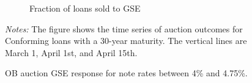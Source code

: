 \documentclass[11pt,a4paper]{article}
\begin{document}
\begin{figure}[h]
\begin{subfigure}[b]{0.49\textwidth}
      \caption{ Fraction of loans sold to GSE}
     \end{subfigure}
     \caption{OB auction  GSE response for note rates between 4\% and 4.75\%. }  
   \begin{minipage}{\textwidth}
      \footnotesize{\textit{Notes:} The figure shows the time series of auction outcomes for Conforming loans with a 30-year maturity. The vertical lines are March 1, April 1st, and April 15th.  } 
      \end{minipage}
\end{figure}
\end{document}
